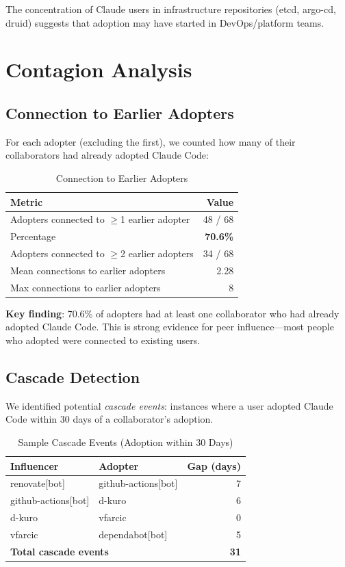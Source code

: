 \documentclass[11pt]{article}
\begin{document}
The concentration of Claude users in infrastructure repositories (etcd, argo-cd, druid) suggests that adoption may have started in DevOps/platform teams.

\section{Contagion Analysis}

\subsection{Connection to Earlier Adopters}

For each adopter (excluding the first), we counted how many of their collaborators had already adopted Claude Code:

\begin{table}[H]
\centering
\caption{Connection to Earlier Adopters}
\label{tab:contagion}
\begin{tabular}{lr}
\toprule
\textbf{Metric} & \textbf{Value} \\
\midrule
Adopters connected to $\geq$1 earlier adopter & 48 / 68 \\
Percentage & \textbf{70.6\%} \\
\midrule
Adopters connected to $\geq$2 earlier adopters & 34 / 68 \\
Mean connections to earlier adopters & 2.28 \\
Max connections to earlier adopters & 8 \\
\bottomrule
\end{tabular}
\end{table}

\textbf{Key finding}: 70.6\% of adopters had at least one collaborator who had already adopted Claude Code. This is strong evidence for peer influence---most people who adopted were connected to existing users.

\subsection{Cascade Detection}

We identified potential \emph{cascade events}: instances where a user adopted Claude Code within 30 days of a collaborator's adoption.

\begin{table}[H]
\centering
\caption{Sample Cascade Events (Adoption within 30 Days)}
\label{tab:cascades}
\begin{tabular}{llr}
\toprule
\textbf{Influencer} & \textbf{Adopter} & \textbf{Gap (days)} \\
\midrule
renovate[bot] & github-actions[bot] & 7 \\
github-actions[bot] & d-kuro & 6 \\
d-kuro & vfarcic & 0 \\
vfarcic & dependabot[bot] & 5 \\
\midrule
\multicolumn{2}{l}{\textbf{Total cascade events}} & \textbf{31} \\
\bottomrule
\end{tabular}
\end{table}
\end{document}
